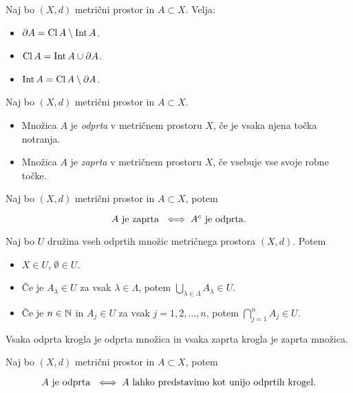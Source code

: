 \begin{trditev}
    Naj bo $(X, d)$ metrični prostor in $A \subset X$. Velja:
    \begin{itemize}
        \item $\partial A = \operatorname{Cl} A \setminus \operatorname{Int} A$.
        \item $\operatorname{Cl} A = \operatorname{Int} A \cup \partial A$.
        \item $\operatorname{Int} A = \operatorname{Cl} A \setminus \partial A$.
    \end{itemize}
\end{trditev}

\begin{definicija}    
    Naj bo $(X, d)$ metrični prostor in $A \subset X$.
    \begin{itemize}
        \item Množica $A$ je \emph{odprta} v metričnem prostoru $X$, če je vsaka njena točka notranja.
        \item Množica $A$ je \emph{zaprta} v metričnem prostoru $X$, če vsebuje vse svoje robne točke.
    \end{itemize}
\end{definicija}

\begin{trditev}
    Naj bo $(X, d)$ metrični prostor in $A \subset X$, potem 

    $$A \text{ je zaprta } \iff A^c \text{ je odprta}.$$
\end{trditev}

\begin{izrek}
    Naj bo $U$ družina vseh odprtih množic metričnega prostora $(X, d)$. Potem
    \begin{itemize}
        \item $X \in U$, $\emptyset \in U$.
        \item Če je $A_\lambda \in U$ za vsak $\lambda \in \Lambda$, potem $ \bigcup_{\lambda \in \Lambda} A_\lambda \in U$.
        \item Če je $n \in \mathbb{N}$ in $A_j \in U$ za vsak $j = 1, 2, \ldots, n$, potem $ \bigcap_{j=1}^n A_j \in U$.
    \end{itemize}
\end{izrek}

\begin{trditev}
    Vsaka odprta krogla je odprta množica in vsaka zaprta krogla je zaprta množica.
\end{trditev}

\begin{trditev}
    Naj bo $(X, d)$ metrični prostor in $A \subset X$, potem 

    $$A \text{ je odprta } \iff A \text{ lahko predstavimo kot unijo odprtih krogel}.$$
\end{trditev}

